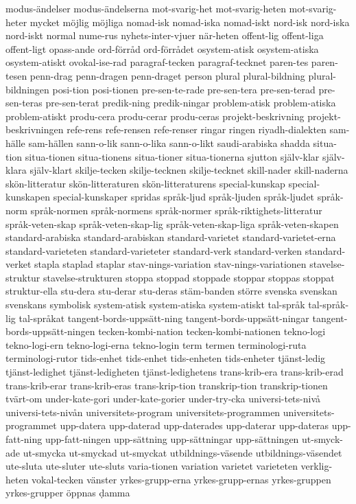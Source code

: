 {modus-ändelser
modus-ändelserna
mot-svarig-het
mot-svarig-heten
mot-svarig-heter
mycket
möjlig
möjliga
nomad-isk
nomad-iska
nomad-iskt
nord-isk
nord-iska
nord-iskt
normal
nume-rus
nyhets-inter-vjuer
när-heten
offent-lig
offent-liga
offent-ligt
opass-ande
ord-förråd
ord-förrådet
osystem-atisk
osystem-atiska
osystem-atiskt
ovokal-ise-rad
paragraf-tecken
paragraf-tecknet
paren-tes
paren-tesen
penn-drag
penn-dragen
penn-draget
person
plural
plural-bildning
plural-bildningen
posi-tion
posi-tionen
pre-sen-te-rade
pre-sen-tera
pre-sen-terad
pre-sen-teras
pre-sen-terat
predik-ning
predik-ningar
problem-atisk
problem-atiska
problem-atiskt
produ-cera
produ-cerar
produ-ceras
projekt-beskrivning
projekt-beskrivningen
refe-rens
refe-rensen
refe-renser
ringar
ringen
riyadh-dialekten
sam-hälle
sam-hällen
sann-o-lik
sann-o-lika
sann-o-likt
saudi-arabiska
shadda
situa-tion
situa-tionen
situa-tionens
situa-tioner
situa-tionerna
sjutton
själv-klar
själv-klara
själv-klart
skilje-tecken
skilje-tecknen
skilje-tecknet
skill-nader
skill-naderna
skön-litteratur
skön-litteraturen
skön-litteraturens
special-kunskap
special-kunskapen
special-kunskaper
spridas
språk-ljud
språk-ljuden
språk-ljudet
språk-norm
språk-normen
språk-normens
språk-normer
språk-riktighets-litteratur
språk-veten-skap
språk-veten-skap-lig
språk-veten-skap-liga
språk-veten-skapen
standard-arabiska
standard-arabiskan
standard-varietet
standard-varietet-erna
standard-varieteten
standard-varieteter
standard-verk
standard-verken
standard-verket
stapla
staplad
staplar
stav-nings-variation
stav-nings-variationen
stavelse-struktur
stavelse-strukturen
stoppa
stoppad
stoppade
stoppar
stoppas
stoppat
struktur-ella
stu-dera
stu-derar
stu-deras
stäm-banden
större
svenska
svenskan
svenskans
symbolisk
system-atisk
system-atiska
system-atiskt
tal-språk
tal-språk-lig
tal-språkat
tangent-bords-uppsätt-ning
tangent-bords-uppsätt-ningar
tangent-bords-uppsätt-ningen
tecken-kombi-nation
tecken-kombi-nationen
tekno-logi
tekno-logi-ern
tekno-logi-erna
tekno-login
term
termen
terminologi-ruta
terminologi-rutor
tids-enhet
tids-enhet
tids-enheten
tids-enheter
tjänst-ledig
tjänst-ledighet
tjänst-ledigheten
tjänst-ledighetens
trans-krib-era
trans-krib-erad
trans-krib-erar
trans-krib-eras
trans-krip-tion
transkrip-tion
transkrip-tionen
tvärt-om
under-kate-gori
under-kate-gorier
under-try-cka
universi-tets-nivå
universi-tets-nivån
universitets-program
universitets-programmen
universitets-programmet
upp-datera
upp-daterad
upp-daterades
upp-daterar
upp-dateras
upp-fatt-ning
upp-fatt-ningen
upp-sättning
upp-sättningar
upp-sättningen
ut-smyck-ade
ut-smycka
ut-smyckad
ut-smyckat
utbildnings-väsende
utbildnings-väsendet
ute-sluta
ute-sluter
ute-sluts
varia-tionen
variation
varietet
varieteten
verklig-heten
vokal-tecken
vänster
yrkes-grupp-erna
yrkes-grupp-ernas
yrkes-gruppen
yrkes-grupper
öppnas
ḍamma
}
